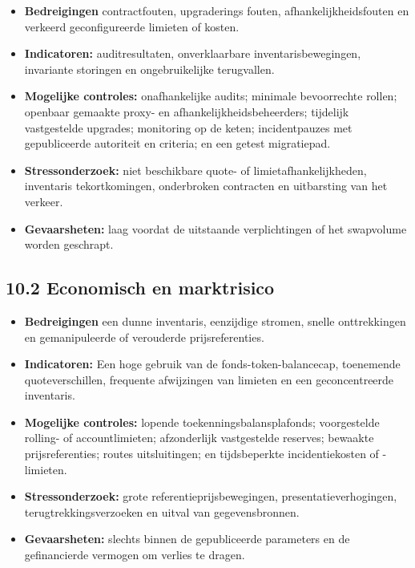 \documentclass[11pt]{article}
\begin{document}
\begin{itemize}[leftmargin=*]
\item \textbf{Bedreigingen} contractfouten, upgraderings fouten, afhankelijkheidsfouten en verkeerd geconfigureerde limieten of kosten.
\item \textbf{Indicatoren:} auditresultaten, onverklaarbare inventarisbewegingen, invariante storingen en ongebruikelijke terugvallen.
\item \textbf{Mogelijke controles:} onafhankelijke audits; minimale bevoorrechte rollen; openbaar gemaakte proxy- en afhankelijkheidsbeheerders; tijdelijk vastgestelde upgrades; monitoring op de keten; incidentpauzes met gepubliceerde autoriteit en criteria; en een getest migratiepad.
\item \textbf{Stressonderzoek:} niet beschikbare quote- of limietafhankelijkheden, inventaris tekortkomingen, onderbroken contracten en uitbarsting van het verkeer.
\item \textbf{Gevaarsheten:} laag voordat de uitstaande verplichtingen of het swapvolume worden geschrapt.
\end{itemize}
\subsection*{10.2 Economisch en marktrisico}

\begin{itemize}[leftmargin=*]
\item \textbf{Bedreigingen} een dunne inventaris, eenzijdige stromen, snelle onttrekkingen en gemanipuleerde of verouderde prijsreferenties.
\item \textbf{Indicatoren:} Een hoge gebruik van de fonds-token-balancecap, toenemende quoteverschillen, frequente afwijzingen van limieten en een geconcentreerde inventaris.
\item \textbf{Mogelijke controles:} lopende toekenningsbalansplafonds; voorgestelde rolling- of accountlimieten; afzonderlijk vastgestelde reserves; bewaakte prijsreferenties; routes uitsluitingen; en tijdsbeperkte incidentiekosten of -limieten.
\item \textbf{Stressonderzoek:} grote referentieprijsbewegingen, presentatieverhogingen, terugtrekkingsverzoeken en uitval van gegevensbronnen.
\item \textbf{Gevaarsheten:} slechts binnen de gepubliceerde parameters en de gefinancierde vermogen om verlies te dragen.
\end{itemize}
\end{document}
